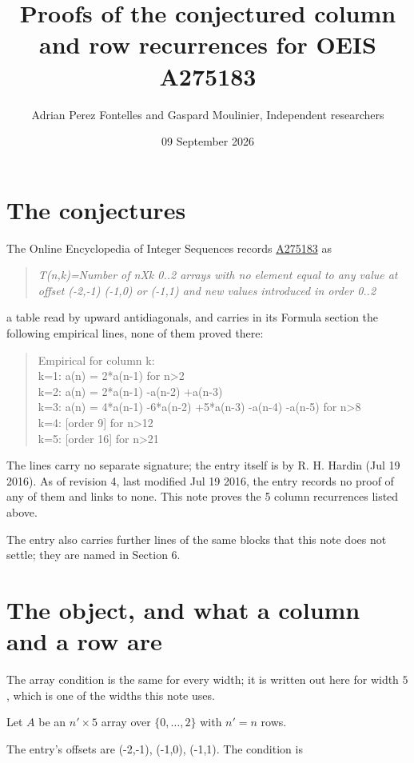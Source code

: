 \documentclass[11pt]{article}
\title{Proofs of the conjectured column and row recurrences for OEIS A275183}
\author{Adrian Perez Fontelles and Gaspard Moulinier, Independent researchers}
\date{09 September 2026}
\theoremstyle{definition}
\begin{document}
\maketitle
\section{The conjectures}

The Online Encyclopedia of Integer Sequences records \href{https://oeis.org/A275183}{A275183} as

\begin{quote}\itshape T(n,k)=Number of nXk 0..2 arrays with no element equal to any value at offset (-2,-1) (-1,0) or (-1,1) and new values introduced in order 0..2\end{quote}

a table read by upward antidiagonals, and carries in its Formula section the following empirical lines, none of them proved there:

\begin{quote}\ttfamily Empirical for column k:\\
k=1: a(n) = 2*a(n-1) for n>2\\k=2: a(n) = 2*a(n-1) -a(n-2) +a(n-3)\\k=3: a(n) = 4*a(n-1) -6*a(n-2) +5*a(n-3) -a(n-4) -a(n-5) for n>8\\k=4: [order 9] for n>12\\k=5: [order 16] for n>21\end{quote}

The lines carry no separate signature; the entry itself is by R. H. Hardin (Jul 19 2016). As of revision 4, last modified Jul 19 2016, the entry records no proof of any of them and links to none. This note proves the 5 column recurrences listed above.

The entry also carries further lines of the same blocks that this note does not settle; they are named in Section 6.

\section{The object, and what a column and a row are}

The array condition is the same for every width; it is written out here for width $5$, which is one of the widths this note uses.

Let $A$ be an $n' \times 5$ array over $\{0,\dots,2\}$ with $n' = n$ rows.

The entry's offsets are (-2,-1), (-1,0), (-1,1). The condition is
\end{document}
